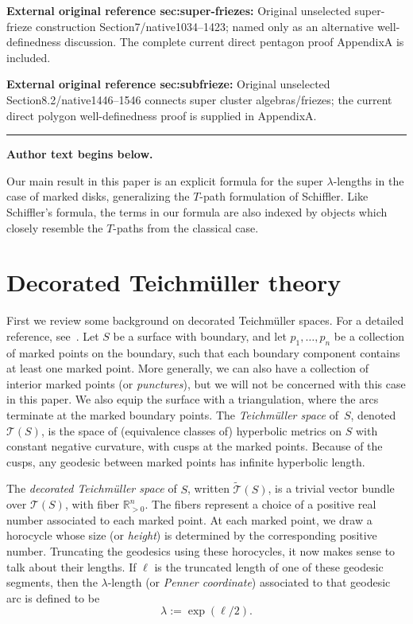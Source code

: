 \documentclass[11pt]{article}
\numberwithin{equation}{section}
\numberwithin{equation}{section}
\begin{document}
\noindent\textbf{External original reference sec:super-friezes:} Original unselected super-frieze construction Section7/native1034–1423; named only as an alternative well-definedness discussion. The complete current direct pentagon proof AppendixA is included.\par
\noindent\textbf{External original reference sec:subfrieze:} Original unselected Section8.2/native1446–1546 connects super cluster algebras/friezes; the current direct polygon well-definedness proof is supplied in AppendixA.\par
\medskip\hrule\medskip\noindent\textbf{Author text begins below.}\par
\setcounter{section}{1}
Our main result in this paper is an explicit formula for the super $\lambda$-lengths in the case of marked disks, generalizing the $T$-path formulation of Schiffler.
 Like Schiffler's formula, the terms in our formula are also indexed by objects which closely resemble the $T$-paths from the classical case.

\setcounter{section}{1}
\section{Decorated Teichm\"uller theory}

First we review some background on decorated Teichm\"{u}ller spaces. For a detailed reference, see~\cite{penner_12}.
%
Let $S$ be a surface with boundary, and let $p_1,\dots,p_n$ be a collection of marked points on the boundary,
such that each boundary component contains at least one marked point. More generally, we can also have a collection of interior marked points (or \emph{punctures}),
but we will not be concerned with this case in this paper. We also equip the surface with a triangulation, where the arcs terminate
at the marked boundary points. The \emph{Teichm\"{u}ller space} of~$S$, denoted~$\mathcal{T}(S)$, is the space of (equivalence classes of) hyperbolic metrics on $S$ with constant negative
curvature, with cusps at the marked points. Because of the cusps, any geodesic between marked points has infinite hyperbolic length.

The \emph{decorated Teichm\"{u}ller space} of $S$, written $\widetilde{\mathcal{T}}(S)$, is a trivial vector bundle over $\mathcal{T}(S)$,
with fiber ${\mathbb R}_{> 0}^n$. The fibers represent a choice of a positive real number associated to each marked point.
At each marked point, we draw a horocycle whose size (or \emph{height}) is determined by the corresponding positive number.
Truncating the geodesics using these horocycles, it now makes sense to talk about their lengths. If $\ell$ is the truncated
length of one of these geodesic segments, then the $\lambda$-length (or \emph{Penner coordinate}) associated to that geodesic arc
is defined to be
\[ \lambda := \exp(\ell/2). \]
\end{document}
